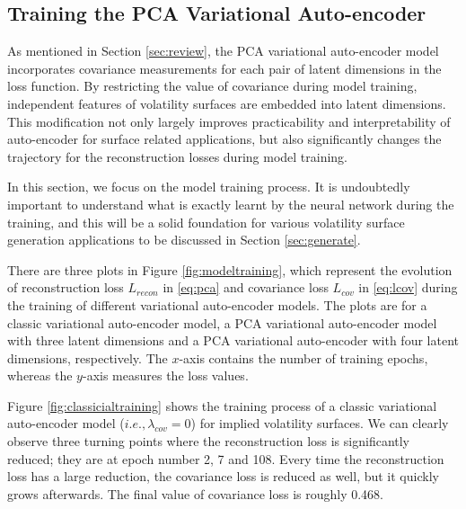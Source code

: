 \documentclass[format=sigconf]{acmart}
\begin{document}

\subsection{Training the PCA Variational Auto-encoder}
\label{ssec:training-PCA-VAE}
As mentioned in Section \ref{sec:review}, the PCA variational auto-encoder model incorporates covariance measurements for each pair of latent dimensions in the loss function. By restricting the value of covariance during model training, independent features of volatility surfaces are embedded into latent dimensions. This modification not only largely improves practicability and interpretability of auto-encoder for surface related applications, but also significantly changes the trajectory for the reconstruction losses during model training. 

In this section, we focus on the model training process. It is undoubtedly important to understand what is exactly learnt by the neural network during the training, and this will be a solid foundation for various volatility surface generation applications to be discussed in Section \ref{sec:generate}.

There are three plots in Figure \ref{fig:modeltraining}, which represent the evolution of reconstruction loss $L_{recon}$ in \eqref{eq:pca} and covariance loss $L_{cov}$ in \eqref{eq:lcov} during the training of different variational auto-encoder models. The plots are for a classic variational auto-encoder model, a PCA variational auto-encoder model with three latent dimensions and a PCA variational auto-encoder with four latent dimensions, respectively. The $x$-axis contains the number of training epochs, whereas the $y$-axis measures the loss values. 

Figure \ref{fig:classicialtraining} shows the training process of a classic variational auto-encoder model ($i.e., \lambda_{cov} = 0$) for implied volatility surfaces. We can clearly observe three turning points where the reconstruction loss is significantly reduced; they are at epoch number 2, 7 and 108. Every time the reconstruction loss has a large reduction, the covariance loss is reduced as well, but it quickly grows afterwards. The final value of covariance loss is roughly 0.468.
\end{document}
